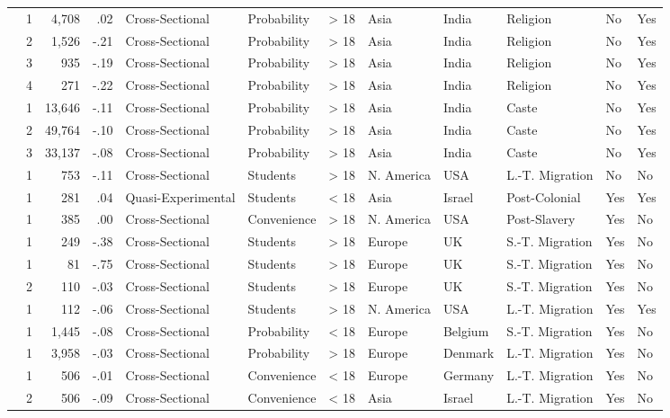 \documentclass[10pt, letterpaper]{article}
\begin{document}
\begin{landscape}
\begin{xltabular}{650pt}{Xrrrllrlllll}
\cite{2385} & 1 & 4,708 & .02 & Cross-Sectional & Probability & > 18 & Asia & India & Religion & No & Yes\\
 & 2 & 1,526 & -.21 & Cross-Sectional & Probability & > 18 & Asia & India & Religion & No & Yes\\
 & 3 & 935 & -.19 & Cross-Sectional & Probability & > 18 & Asia & India & Religion & No & Yes\\
 & 4 & 271 & -.22 & Cross-Sectional & Probability & > 18 & Asia & India & Religion & No & Yes\\
\cite{2392} & 1 & 13,646 & -.11 & Cross-Sectional & Probability & > 18 & Asia & India & Caste & No & Yes\\
 & 2 & 49,764 & -.10 & Cross-Sectional & Probability & > 18 & Asia & India & Caste & No & Yes\\
 & 3 & 33,137 & -.08 & Cross-Sectional & Probability & > 18 & Asia & India & Caste & No & Yes\\
\cite{1891} & 1 & 753 & -.11 & Cross-Sectional & Students & > 18 & N. America & USA & L.-T. Migration & No & No\\
\cite{789} & 1 & 281 & .04 & Quasi-Experimental & Students & < 18 & Asia & Israel & Post-Colonial & Yes & Yes\\
\cite{3060} & 1 & 385 & .00 & Cross-Sectional & Convenience & > 18 & N. America & USA & Post-Slavery & Yes & No\\
\cite{733} & 1 & 249 & -.38 & Cross-Sectional & Students & > 18 & Europe & UK & S.-T. Migration & Yes & No\\
\cite{1020} & 1 & 81 & -.75 & Cross-Sectional & Students & > 18 & Europe & UK & S.-T. Migration & Yes & No\\
 & 2 & 110 & -.03 & Cross-Sectional & Students & > 18 & Europe & UK & S.-T. Migration & Yes & No\\
\cite{2375} & 1 & 112 & -.06 & Cross-Sectional & Students & > 18 & N. America & USA & L.-T. Migration & Yes & Yes\\
\cite{46} & 1 & 1,445 & -.08 & Cross-Sectional & Probability & < 18 & Europe & Belgium & S.-T. Migration & Yes & No\\
\cite{1412} & 1 & 3,958 & -.03 & Cross-Sectional & Probability & > 18 & Europe & Denmark & L.-T. Migration & Yes & No\\
\cite{1966} & 1 & 506 & -.01 & Cross-Sectional & Convenience & < 18 & Europe & Germany & L.-T. Migration & Yes & No\\
 & 2 & 506 & -.09 & Cross-Sectional & Convenience & < 18 & Asia & Israel & L.-T. Migration & Yes & No\\

\end{xltabular}
\end{landscape}
\end{document}
